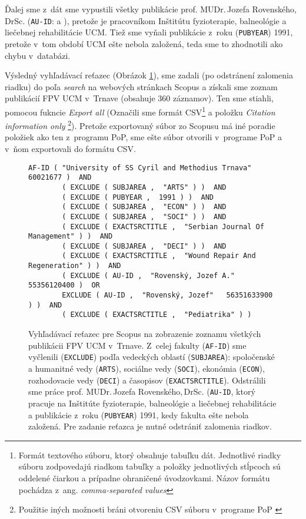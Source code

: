   Ďalej sme z~dát sme vypustili všetky publikácie  prof. MUDr.\,Jozefa
  Rovenského,\,DrSc.  (\texttt{AU-ID}:  a ), pretože je pracovníkom Inštitútu fyzioterapie, balneológie a
  liečebnej rehabilitácie UCM. Tiež sme vyňali publikácie z~roku
  (\texttt{PUBYEAR}) 1991, pretože v~tom období UCM ešte nebola založená, teda
  sme to zhodnotili ako chybu v~databázi.

  Výsledný vyhľadávací reťazec (Obrázok \ref{fig:scopus.query}), sme zadali (po
  odstránení zalomenia riadku) do poľa \emph{search} na webových stránkach Scopus
  a získali sme zoznam publikácií FPV UCM v~Trnave (obsahuje 360 záznamov). Ten
  sme stiahli, pomocou fukncie \emph{Export all} (Označili sme formát
  CSV\footnote{Formát textového súboru, ktorý obsahuje tabuľku dát. Jednotlivé
  riadky súboru zodpovedajú riadkom tabuľky a položky jednotlivých stĺpcoch sú
  oddelené čiarkou a prípadne ohraničené úvodzovkami.  Názov formátu pochádza
  z~ang.  \emph{comma-separated values}} a položku \emph{Citation information
  only} \footnote {Použitie iných možnosti bráni otvoreniu CSV súboru
  v~programe PoP \citep{Harzing2011}}).  Pretože exportovaný súbor zo Scopusu má
  iné poradie položiek ako ten z~programu PoP, sme ešte súbor otvorili v~programe
  PoP a v~ňom exportovali do formátu CSV.


  \begin{figure}
    \footnotesize
    \begin{Verbatim}[frame=single]
      AF-ID ( "University of SS Cyril and Methodius Trnava"   60021677 )  AND
        ( EXCLUDE ( SUBJAREA ,  "ARTS" ) )  AND
        ( EXCLUDE ( PUBYEAR ,  1991 ) )  AND
        ( EXCLUDE ( SUBJAREA ,  "ECON" ) )  AND
        ( EXCLUDE ( SUBJAREA ,  "SOCI" ) )  AND
        ( EXCLUDE ( EXACTSRCTITLE ,  "Serbian Journal Of Management" ) )  AND
        ( EXCLUDE ( SUBJAREA ,  "DECI" ) )  AND
        ( EXCLUDE ( EXACTSRCTITLE ,  "Wound Repair And Regeneration" ) )  AND
        ( EXCLUDE ( AU-ID ,  "Rovenský, Jozef A."   55356120400 )  OR
        EXCLUDE ( AU-ID ,  "Rovenský, Jozef"   56351633900 ) )  AND
        ( EXCLUDE ( EXACTSRCTITLE ,  "Pediatrika" ) )
    \end{Verbatim}
    \vspace*{-4mm}
    \caption[Vyhľahávaci reťazec pre celú fakultu pre Scopus]{Vyhľadávací reťazec
    pre Scopus na zobrazenie zoznamu všetkých publikácii FPV UCM v~Trnave.
    Z~celej fakulty (\texttt{AF-ID})
    sme vyčlenili (\texttt{EXCLUDE}) podľa vedeckých oblastí (\texttt{SUBJAREA}):
    spoločenské a humanitné vedy (\texttt{ARTS}), sociálne vedy (\texttt{SOCI}),
    ekonómia (\texttt{ECON}), rozhodovacie vedy (\texttt{DECI}) a časopisov
    (\texttt{EXACTSRCTITLE}).  Odstrálili sme práce prof. MUDr.\,Jozefa
    Rovenského,\,DrSc.  (\texttt{AU-ID}, ktorý pracuje na Inštitúte fyzioterapie,
    balneológie a liečebnej rehabilitácie a publikácie z~roku (\texttt{PUBYEAR})
    1991, kedy fakulta ešte nebola založená. Pre zadanie reťazca je nutné
    odstrániť zalomenia riadkov.}
    \label{fig:scopus.query}
  \end{figure}


